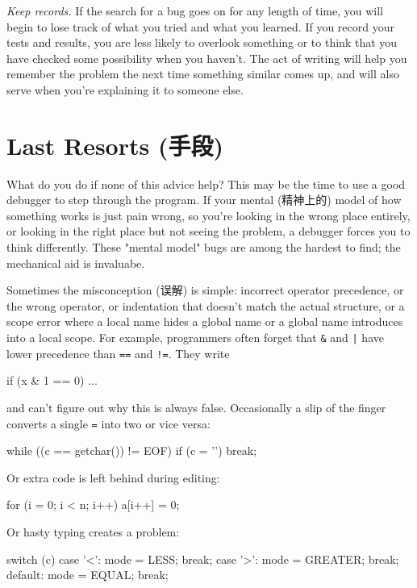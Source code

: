 \emph{Keep records.} If the search for a bug goes on for any length of
time, you will begin to lose track of what you tried and what you learned.
If you record your tests and results, you are less likely to overlook
something or to think that you have checked some possibility when you
haven't. The act of writing will help you remember the problem the next
time something similar comes up, and will also serve when you're explaining
it to someone else.

\section{Last Resorts (手段)}
\label{sec:last_resorts}
What do you do if none of this advice help? This may be the time to use a
good debugger to step through the program. If your mental (精神上的) model
of how something works is just pain wrong, so you're looking in the wrong
place entirely, or looking in the right place but not seeing the problem, a
debugger forces you to think differently. These "mental model" bugs are
among the hardest to find; the mechanical aid is invaluabe.

Sometimes the misconception (误解) is simple: incorrect operator
precedence, or the wrong operator, or indentation that doesn't match the
actual structure, or a scope error where a local name hides a global name
or a global name introduces into a local scope. For example, programmers
often forget that \verb'&' and \verb'|' have lower precedence than
\verb'==' and \verb'!='. They write
\begin{badcode}
    if (x & 1 == 0)
        ...
\end{badcode}
and can't figure out why this is always false. Occasionally a slip of the
finger converts a single \verb'=' into two or vice versa:
\begin{badcode}
    while ((c == getchar()) != EOF)
        if (c = '\n')
            break;
\end{badcode}
Or extra code is left behind during editing:
\begin{badcode}
    for (i = 0; i < n; i++)
        a[i++] = 0;
\end{badcode}
Or hasty typing creates a problem:
\begin{badcode}
    switch (c) {
        case '<':
            mode = LESS;
            break;
        case '>':
            mode = GREATER;
            break;
        default:
            mode = EQUAL;
            break;
    }
\end{badcode}


